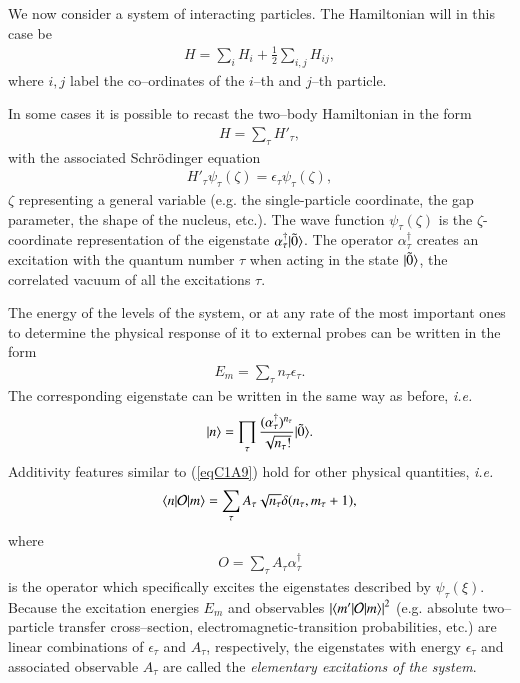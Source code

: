 We now  consider a system of interacting particles. The Hamiltonian will in this case be
\begin{align}\label{eqC1A6}
H=\sum_i H_i+\frac{1}{2}\sum_{i,j}H_{ij},
\end{align}
where $i,j$ label the co--ordinates of the $i$--th and $j$--th particle.

In some cases it is possible to recast the two--body Hamiltonian in the form
\begin{align}\label{eqC1A7}
H=\sum_\tau H'_\tau,
\end{align}
with the associated Schr\"odinger equation
\begin{align}\label{eqC1A8}
H'_\tau\psi_\tau(\zeta)=\epsilon_\tau \psi_\tau(\zeta),
\end{align}
$\zeta$ representing a general variable (e.g. the single-particle coordinate, the gap parameter, the shape of the nucleus, etc.). The wave function $\psi_\tau(\zeta)$ is the $\zeta$-coordinate representation of the eigenstate $\alpha_\tau^\dagger|{\tilde 0} \rangle$. The operator $\alpha_\tau^\dagger$ creates an excitation with the quantum number $\tau$ when acting in the state $|{\tilde 0} \rangle$, the correlated vacuum of all the excitations $\tau$.



The energy of the levels of the system, or at any rate of the most important
ones to determine the physical response of it to external probes can be written
in the form
\begin{align}\label{eqC1A9}
E_m=\sum_{\tau}n_\tau \epsilon_\tau.
\end{align}
The corresponding eigenstate can be written in the same way as before, \textit{i.e.}
\begin{align}\label{eqC1A10}
|{n} \rangle=\prod_\tau\frac{(\alpha_\tau^\dagger)^{n_\tau}}{\sqrt{n_\tau!}}|{\tilde 0} \rangle.
\end{align}
Additivity features similar to (\ref{eqC1A9}) hold for other physical quantities, \textit{i.e.}
\begin{align}\label{eqC1A11}
\langle {n|\mathcal O|m} \rangle=\sum_{\tau}A_\tau\sqrt{n_\tau} \delta(n_\tau,m_\tau+1),
\end{align}
where
\begin{align}\label{eqC1A12} O=\sum_{\tau}A_\tau \alpha_\tau^\dagger
\end{align}
is the operator which specifically excites the eigenstates described by $\psi_\tau(\xi)$.
Because the excitation energies $E_m$ and observables $\left|\langle {m'|\mathcal O|m} \rangle\right|^2$ (e.g. absolute two--particle transfer cross--section, electromagnetic-transition probabilities, etc.) are
linear combinations of $\epsilon_\tau$ and $A_\tau$, respectively, the eigenstates with energy $\epsilon_\tau$
and associated observable $A_\tau$ are called the \textit{elementary excitations of the system}.


